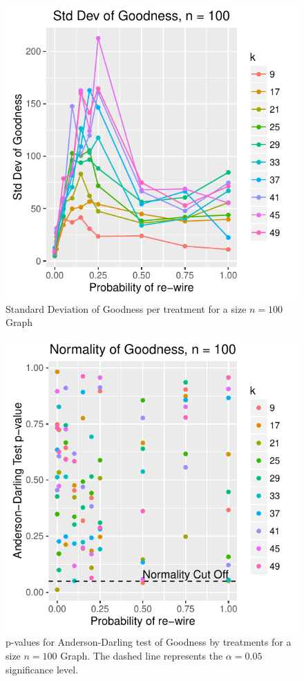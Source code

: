 \documentclass{article}
\begin{document}
\begin{figure}
\centering
\includegraphics[width=1\textwidth]{4-sdG_by_p_k_n100.pdf}
\caption{\label{fig:Gsd}Standard Deviation of Goodness per treatment for a size $n = 100$ Graph}
\end{figure}

\begin{figure}
\centering
\includegraphics[width=1\textwidth]{5-normG_by_p_k_n100.pdf}
\caption{\label{fig:Gad}p-values for Anderson-Darling test of Goodness by treatments for a size $n = 100$ Graph. The dashed line represents the $\alpha = 0.05$ significance level.}
\end{figure}
\end{document}
